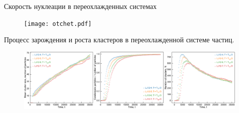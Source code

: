 \documentclass{beamer}
\begin{document}
\begin{frame}{Скорость нуклеации в переохлажденных системах}
\footnotesize{


\begin{figure}[!t]
	 \centering
	 \texttt{[image: otchet.pdf]}
	 \label{otchet}
\end{figure}

Процесс зарождения и роста кластеров в переохлажденной системе частиц.

\begin{figure}[!t]
    \centering
    \includegraphics[width=\linewidth]{nucleation.pdf}
    \label{nucleation}
\end{figure}


}

\end{frame}
\end{document}
